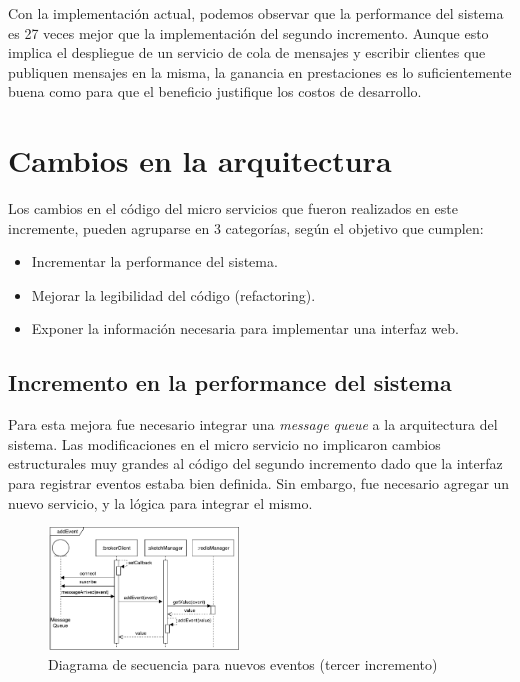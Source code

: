 \documentclass[a4paper,10pt, oneside]{article}
\begin{document}
Con la implementación actual, podemos observar que la performance del sistema es 27 veces mejor que la implementación del segundo incremento. Aunque esto implica el despliegue de un servicio de cola de mensajes y escribir clientes que publiquen mensajes en la misma, la ganancia en prestaciones es lo suficientemente buena como para que el beneficio justifique los costos de desarrollo.

\section{Cambios en la arquitectura}
Los cambios en el código del micro servicios que fueron realizados en este incremente, pueden agruparse en 3 categorías, según el objetivo que cumplen:
\begin{itemize}
	\item Incrementar la performance del sistema.
	\item Mejorar la legibilidad del código (refactoring).
	\item Exponer la información necesaria para implementar una interfaz web.
\end{itemize}

\subsection{Incremento en la performance del sistema}
Para esta mejora fue necesario integrar una \textit{message queue} a la arquitectura del sistema. Las modificaciones en el micro servicio no implicaron cambios estructurales muy grandes al código del segundo incremento dado que la interfaz para registrar eventos estaba bien definida. Sin embargo, fue necesario agregar un nuevo servicio, y la lógica para integrar el mismo. 

\begin{figure}[htbp]
	\centering
	\includegraphics[width=0.45\textwidth]{./graph/SecDiag-resourceAddEventMosquitto.pdf}
	\caption{Diagrama de secuencia para nuevos eventos (tercer incremento)}
	\label{fig:SecDiagResourceAddEvent-Mosquitto}
\end{figure}
\end{document}
